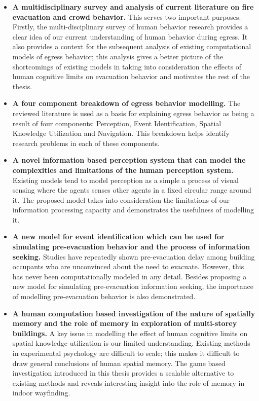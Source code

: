 \begin{itemize}

	\item \textbf{A multidisciplinary survey and analysis of current literature on fire evacuation and crowd behavior.} This serves two important purposes. Firstly, the multi-disciplinary survey of human behavior research provides a clear idea of our current understanding of human behavior during egress. It also provides a context for the subsequent analysis of existing computational models of egress behavior; this analysis gives a better picture of the shortcomings of existing models in taking into consideration the effects of human cognitive limits on evacuation behavior and motivates the rest of the thesis.

    \item \textbf{A four component breakdown of egress behavior modelling.} The reviewed literature is used as a basis for explaining egress behavior as being a result of four components: Perception, Event Identification, Spatial Knowledge Utilization and Navigation. This breakdown helps identify research problems in each of these components.

	\item \textbf{A novel information based perception system that can model the complexities and limitations of the human perception system.} Existing models tend to model perception as a simple a process of visual sensing where the agents senses other agents in a fixed circular range around it. The proposed model takes into consideration the limitations of our information processing capacity and demonstrates the usefulness of modelling it.

	\item \textbf{A new model for event identification which can be used for simulating pre-evacuation behavior and the process of information seeking.} Studies have repeatedly shown pre-evacuation delay among building occupants who are unconvinced about the need to evacuate. However, this has never been computationally modeled in any detail.  Besides proposing a new model for simulating pre-evacuation information seeking, the importance of modelling pre-evacuation behavior is also demonstrated.

	\item \textbf{A human computation based investigation of the nature of spatially  memory and the role of memory in exploration of multi-storey buildings.} A key issue in modelling the effect of human cognitive limits on spatial knowledge utilization is our limited understanding. Existing methods in experimental psychology are difficult to scale; this makes it difficult to draw general conclusions of human spatial memory. The game based investigation introduced in this thesis provides a scalable alternative to existing methods and reveals interesting insight into the role of memory in indoor wayfinding.


\end{itemize}
